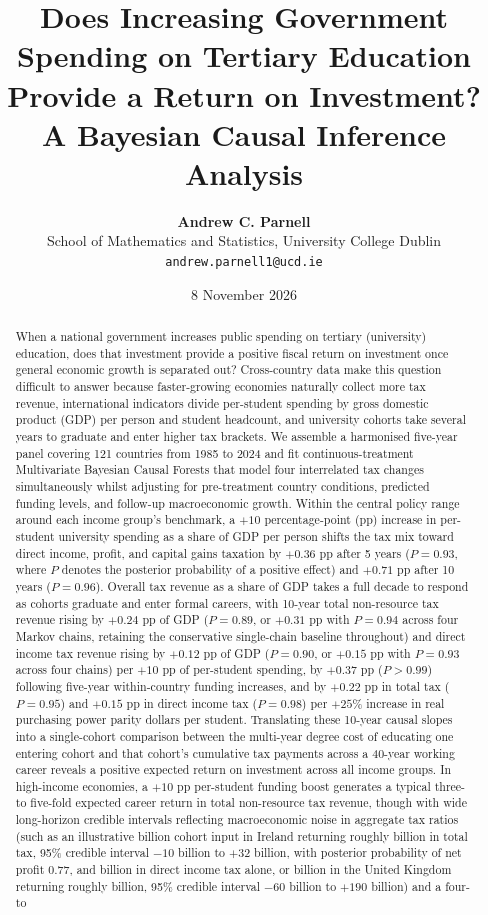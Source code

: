 \documentclass[11pt,a4paper]{article}
\title{\textbf{Does Increasing Government Spending on Tertiary Education Provide a Return on Investment? A Bayesian Causal Inference Analysis}}
\author{
  \textbf{Andrew C. Parnell}\\[0.3em]
  \small School of Mathematics and Statistics, University College Dublin\\
  \small \texttt{andrew.parnell1@ucd.ie}
}
\date{8 November 2026}
\begin{document}
\maketitle

\begin{abstract}
\noindent When a national government increases public spending on tertiary (university) education, does that investment provide a positive fiscal return on investment once general economic growth is separated out? Cross-country data make this question difficult to answer because faster-growing economies naturally collect more tax revenue, international indicators divide per-student spending by gross domestic product (GDP) per person and student headcount, and university cohorts take several years to graduate and enter higher tax brackets. We assemble a harmonised five-year panel covering 121 countries from 1985 to 2024 and fit continuous-treatment Multivariate Bayesian Causal Forests that model four interrelated tax changes simultaneously whilst adjusting for pre-treatment country conditions, predicted funding levels, and follow-up macroeconomic growth. Within the central policy range around each income group's benchmark, a $+10$ percentage-point (pp) increase in per-student university spending as a share of GDP per person shifts the tax mix toward direct income, profit, and capital gains taxation by $+0.36$ pp after 5 years ($P = 0.93$, where $P$ denotes the posterior probability of a positive effect) and $+0.71$ pp after 10 years ($P = 0.96$). Overall tax revenue as a share of GDP takes a full decade to respond as cohorts graduate and enter formal careers, with 10-year total non-resource tax revenue rising by $+0.24$ pp of GDP ($P = 0.89$, or $+0.31$ pp with $P = 0.94$ across four Markov chains, retaining the conservative single-chain baseline throughout) and direct income tax revenue rising by $+0.12$ pp of GDP ($P = 0.90$, or $+0.15$ pp with $P = 0.93$ across four chains) per $+10$ pp of per-student spending, by $+0.37$ pp ($P > 0.99$) following five-year within-country funding increases, and by $+0.22$ pp in total tax ($P = 0.95$) and $+0.15$ pp in direct income tax ($P = 0.98$) per $+25\%$ increase in real purchasing power parity dollars per student. Translating these 10-year causal slopes into a single-cohort comparison between the multi-year degree cost of educating one entering cohort and that cohort's cumulative tax payments across a 40-year working career reveals a positive expected return on investment across all income groups. In high-income economies, a $+10$ pp per-student funding boost generates a typical three- to five-fold expected career return in total non-resource tax revenue, though with wide long-horizon credible intervals reflecting macroeconomic noise in aggregate tax ratios (such as an illustrative  billion cohort input in Ireland returning roughly  billion in total tax, 95\% credible interval \texteuro$-10$ billion to \texteuro$+32$ billion, with posterior probability of net profit $0.77$, and  billion in direct income tax alone, or  billion in the United Kingdom returning roughly  billion, 95\% credible interval \texteuro$-60$ billion to \texteuro$+190$ billion) and a four- to 
\end{abstract}
\end{document}
